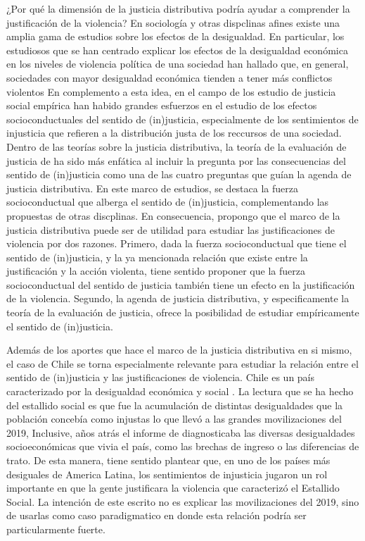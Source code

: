 \documentclass[12pt,twoside]{templates/facsothesis}
\begin{document}
¿Por qué la dimensión de la justicia distributiva podría ayudar a comprender la justificación de la violencia? En sociología y otras dispclinas afines existe una amplia gama de estudios sobre los efectos de la desigualdad. En particular, los estudiosos que se han centrado explicar los efectos de la desigualdad económica en los niveles de violencia política de una sociedad han hallado que, en general, sociedades con mayor desigualdad económica tienden a tener más conflictos violentos \citep{Ostby2013} En complemento a esta idea, en el campo de los estudio de justicia social empírica han habido grandes esfuerzos en el estudio de los efectos socioconductuales del sentido de (in)justicia, especialmente de los sentimientos de injusticia que refieren a la distribución justa de los reccursos de una sociedad. Dentro de las teorías sobre la justicia distributiva, la teoría de la evaluación de justicia de \citet{Jasso1980} ha sido más enfática al incluir la pregunta por las consecuencias del sentido de (in)justicia como una de las cuatro preguntas que guían la agenda de justicia distributiva. En este marco de estudios, se destaca la fuerza socioconductual que alberga el sentido de (in)justicia, complementando las propuestas de otras discplinas. En consecuencia, propongo que el marco de la justicia distributiva puede ser de utilidad para estudiar las justificaciones de violencia por dos razones. Primero, dada la fuerza socioconductual que tiene el sentido de (in)justicia, y la ya mencionada relación que existe entre la justificación y la acción violenta, tiene sentido proponer que la fuerza socioconductual del sentido de justicia también tiene un efecto en la justificación de la violencia. Segundo, la agenda de justicia distributiva, y especificamente la teoría de la evaluación de justicia, ofrece la posibilidad de estudiar empíricamente el sentido de (in)justicia.

Además de los aportes que hace el marco de la justicia distributiva en si mismo, el caso de Chile se torna especialmente relevante para estudiar la relación entre el sentido de (in)justicia y las justificaciones de violencia. Chile es un país caracterizado por la desigualdad económica y social \citep{PNUD2017}. La lectura que se ha hecho del estallido social es que fue la acumulación de distintas desigualdades que la población concebía como injustas lo que llevó a las grandes movilizaciones del 2019, Inclusive, años atrás el informe de \citet{PNUD2017} diagnosticaba las diversas desigualdades socioeconómicas que vivia el país, como las brechas de ingreso o las diferencias de trato. De esta manera, tiene sentido plantear que, en uno de los países más desiguales de America Latina, los sentimientos de injusticia jugaron un rol importante en que la gente justificara la violencia que caracterizó el Estallido Social. La intención de este escrito no es explicar las movilizaciones del 2019, sino de usarlas como caso paradigmatico en donde esta relación podría ser particularmente fuerte.
\end{document}
